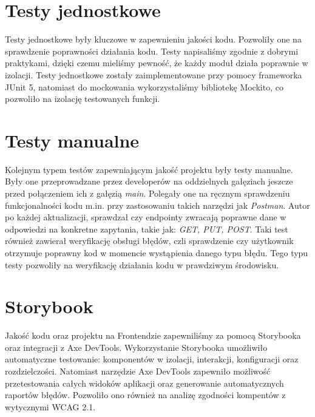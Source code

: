 \section{Testy jednostkowe}
Testy jednostkowe były kluczowe w zapewnieniu jakości kodu. Pozwoliły one na sprawdzenie poprawności działania kodu. Testy napisaliśmy zgodnie z dobrymi praktykami, dzięki czemu mieliśmy pewność, że każdy moduł działa poprawnie w izolacji. Testy jednostkowe zostały zaimplementowane przy pomocy frameworka JUnit 5, natomiast do mockowania wykorzystaliśmy bibliotekę Mockito, co pozwoliło na izolację testowanych funkcji.

\section{Testy manualne}
Kolejnym typem testów zapewniającym jakość projektu były testy manualne. Były one przeprowadzane przez developerów na oddzielnych gałęziach jeszcze przed połączeniem ich z gałęzią \emph{main}. Polegały one na ręcznym sprawdzeniu funkcjonalności kodu m.in. przy zastosowaniu takich narzędzi jak \emph{Postman}.
Autor po każdej aktualizacji, sprawdzał czy endpointy zwracają poprawne dane w odpowiedzi na konkretne zapytania, takie jak: \emph{GET, PUT, POST}. Taki test również zawierał weryfikację obsługi błędów, czli sprawdzenie czy użytkownik otrzymuje poprawny kod w momencie wystąpienia danego typu błędu. Tego typu testy pozwoliły
na weryfikację działania kodu w prawdziwym środowisku.

\section{Storybook}
Jakość kodu oraz projektu na Frontendzie zapewniliśmy za pomocą Storybooka oraz integracji z Axe DevTools. Wykorzystanie Storybooka umożliwiło automatyczne testowanie: komponentów w izolacji, interakcji, konfiguracji oraz rozdzielczości. Natomiast narzędzie Axe DevTools zapewniło możliwość przetestowania całych widoków aplikacji oraz generowanie automatycznych raportów błędów. Pozwoliło ono również na analizę zgodności kompentów z wytycznymi WCAG 2.1.